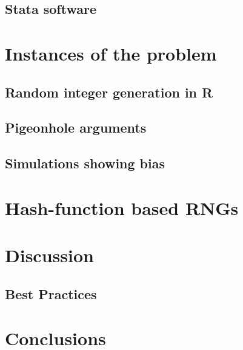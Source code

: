 \documentclass[12pt]{article}
\begin{document}
\subsection{Stata software}
\section{Instances of the problem}
\subsection{Random integer generation in R}
\subsection{Pigeonhole arguments}
\subsection{Simulations showing bias}
\section{Hash-function based RNGs}
\section{Discussion}
\subsection{Best Practices}
\section{Conclusions}
\end{document}

